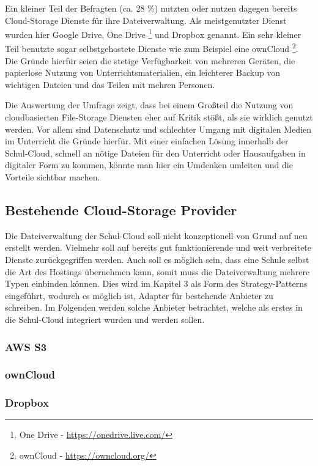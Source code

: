 Ein kleiner Teil der Befragten (ca. 28 \%) nutzten oder nutzen dagegen bereits Cloud-Storage Dienste für ihre Dateiverwaltung. Als meistgenutzter Dienst wurden hier Google Drive, One Drive  \footnote{One Drive - \url{https://onedrive.live.com/}} und Dropbox genannt. Ein sehr kleiner Teil benutzte sogar selbstgehostete Dienste wie zum Beispiel eine ownCloud \footnote{ownCloud - \url{https://owncloud.org/}}. Die Gründe hierfür seien die stetige Verfügbarkeit von mehreren Geräten, die papierlose Nutzung von Unterrichtsmaterialien, ein leichterer Backup von wichtigen Dateien und das Teilen mit mehren Personen. 

Die Auswertung der Umfrage zeigt, dass bei einem Großteil die Nutzung von cloudbasierten File-Storage Diensten eher auf Kritik stößt, als sie wirklich genutzt werden. Vor allem sind Datenschutz und schlechter Umgang mit digitalen Medien im Unterricht die Gründe hierfür. Mit einer einfachen Lösung innerhalb der Schul-Cloud, schnell an nötige Dateien für den Unterricht oder Hausaufgaben in digitaler Form zu kommen, könnte man hier ein Umdenken umleiten und die Vorteile sichtbar machen.

\subsection{Bestehende Cloud-Storage Provider}

Die Dateiverwaltung der Schul-Cloud soll nicht konzeptionell von Grund auf neu erstellt werden. Vielmehr soll auf bereits gut funktionierende und weit verbreitete Dienste zurückgegriffen werden. Auch soll es möglich sein, dass eine Schule selbst die Art des Hostings übernehmen kann, somit muss die Dateiverwaltung mehrere Typen einbinden können. Dies wird im Kapitel 3 als Form des Strategy-Patterns eingeführt, wodurch es möglich ist, Adapter für bestehende Anbieter zu schreiben. Im Folgenden werden solche Anbieter betrachtet, welche als erstes in die Schul-Cloud integriert wurden und werden sollen.

\subsubsection{AWS S3}

\subsubsection{ownCloud}

\subsubsection{Dropbox}


\clearpage
